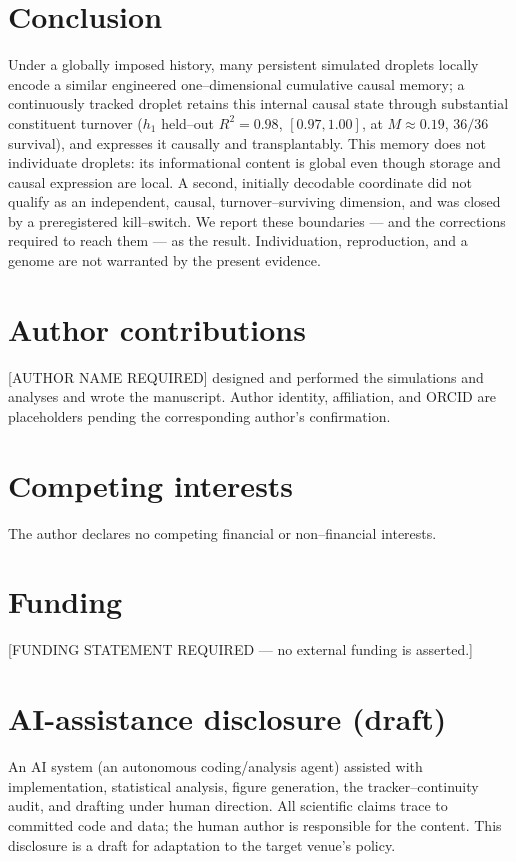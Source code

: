 \documentclass[11pt]{article}
\begin{document}
\section{Conclusion}
Under a globally imposed history, many persistent simulated droplets locally encode a similar engineered
one--dimensional cumulative causal memory; a continuously tracked droplet retains this internal causal state through
substantial constituent turnover ($h_1$ held--out $R^2=0.98$, $[0.97,1.00]$, at $M\approx0.19$, $36/36$ survival),
and expresses it causally and transplantably. This memory does not individuate droplets: its informational content
is global even though storage and causal expression are local. A second, initially decodable coordinate did not
qualify as an independent, causal, turnover--surviving dimension, and was closed by a preregistered kill--switch.
We report these boundaries --- and the corrections required to reach them --- as the result. Individuation,
reproduction, and a genome are not warranted by the present evidence.

\section*{Author contributions}
[AUTHOR NAME REQUIRED] designed and performed the simulations and analyses and wrote the manuscript. Author
identity, affiliation, and ORCID are placeholders pending the corresponding author's confirmation.

\section*{Competing interests}
The author declares no competing financial or non--financial interests.

\section*{Funding}
[FUNDING STATEMENT REQUIRED --- no external funding is asserted.]

\section*{AI-assistance disclosure (draft)}
An AI system (an autonomous coding/analysis agent) assisted with implementation, statistical analysis, figure
generation, the tracker--continuity audit, and drafting under human direction. All scientific claims trace to
committed code and data; the human author is responsible for the content. This disclosure is a draft for adaptation
to the target venue's policy.
\end{document}
